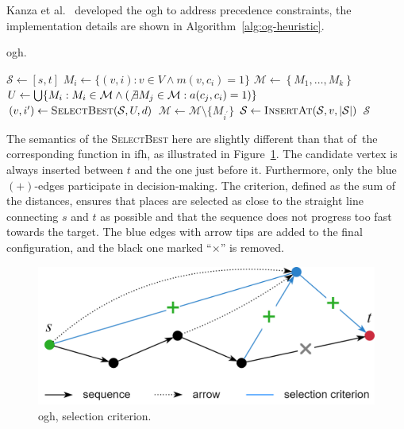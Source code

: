 Kanza et al.~\cite{kanza10} developed the \ac{ogh} to address precedence constraints, the implementation details are shown in Algorithm~\ref{alg:og-heuristic}.

\begin{algorithm}
\caption{\acl{ogh}.}\label{alg:og-heuristic}
\begin{algorithmic}
  \State $\mathcal{S} \gets \left[ s, t \right]$ 
    \State $M_{i} \leftarrow \{ (v, i) : v \in V \wedge m(v, c_{i}) = 1 \}$ 
  \EndFor
  \State $\mathcal{M} \gets \left\{ M_{1}, \ldots, M_{k} \right\}$
    \State $U \gets \bigcup \{ M_{i} : M_{i} \in \mathcal{M} \wedge \left( \not\exists M_{j} \in \mathcal{M} : a(c_{j}, c_{i}) = 1 \right) \}$ 
    \State $(v, i^{\prime}) \gets \textsc{SelectBest}(\mathcal{S}, U, d)$
    \State $\mathcal{M} \gets \mathcal{M} \setminus \{ M_{i^{\prime}} \}$
    \State $\mathcal{S} \gets \textsc{InsertAt}(\mathcal{S}, v, \lvert \mathcal{S} \rvert)$
  \EndWhile
  \State \Return $\mathcal{S}$
\EndFunction
\end{algorithmic}
\end{algorithm}

The semantics of the \textsc{SelectBest} here are slightly different than that of~the corresponding function in \acs{ifh}, as illustrated in Figure~\ref{fig:og-heuristic}. The candidate vertex is always inserted between $t$ and the one just before it. Furthermore, only the blue $(+)$-edges participate in decision-making. The criterion, defined as the sum of the distances, ensures that places are selected as close to the straight line connecting $s$ and $t$ as possible and that the sequence does not progress too fast towards the target. The blue edges with arrow tips are added to the final configuration, and the black one marked ``$\times$'' is removed.

\begin{figure}[!h]
\centering
\includegraphics[width=0.70\linewidth]{img/design/og-heuristic.png}
\caption{\acl{ogh}, selection criterion.}
\label{fig:og-heuristic}
\end{figure}

